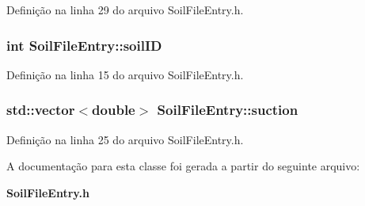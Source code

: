 Definição na linha 29 do arquivo Soil\+File\+Entry.\+h.

\subsubsection[{soil\+ID}]{\setlength{\rightskip}{0pt plus 5cm}int Soil\+File\+Entry\+::soil\+ID\hspace{0.3cm}{\ttfamily [protected]}}\label{class_soil_file_entry_a371763dc14ee6e2d744b87b8a401af32}


Definição na linha 15 do arquivo Soil\+File\+Entry.\+h.

\subsubsection[{suction}]{\setlength{\rightskip}{0pt plus 5cm}std\+::vector$<$double$>$ Soil\+File\+Entry\+::suction\hspace{0.3cm}{\ttfamily [protected]}}\label{class_soil_file_entry_ae41f2528f8c0c4613f638c9446039fb8}


Definição na linha 25 do arquivo Soil\+File\+Entry.\+h.



A documentação para esta classe foi gerada a partir do seguinte arquivo\+:\begin{DoxyCompactItemize}
\item 
{\bf Soil\+File\+Entry.\+h}\end{DoxyCompactItemize}
